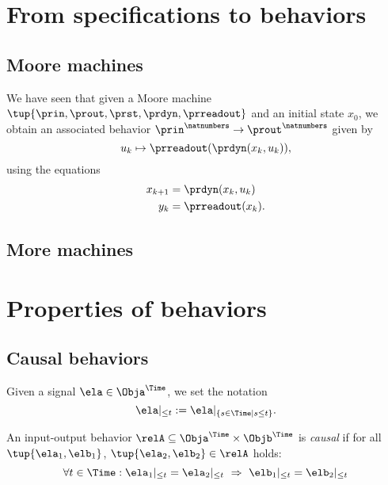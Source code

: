\section{From specifications to behaviors}


\subsection{Moore machines}

We have seen that given a Moore machine $\tup{\prin, \prout, \prst, \prdyn, \prreadout}$ and an initial state $x_0$, we obtain an associated behavior $\prin^\natnumbers \to  \prout^\natnumbers$ given by 
\begin{equation}
u_k \mapsto \prreadout(\prdyn(x_k, u_k)), 
\end{equation}
using the equations
\begin{align}
x_{k+1} &= \prdyn(x_k, u_k) \\
y_{k} &= \prreadout(x_{k}).
\end{align}



\subsection{More machines}


\section{Properties of behaviors}

\subsection{Causal behaviors}

Given a signal $\ela \in \Obja^\Time$, we set the notation
\begin{equation}
    \ela \vert_{\leq t} :=  \ela \vert_{\{ s \in \Time \mid s \leq t\}}.
\end{equation}

\begin{definition}
    An input-output behavior $\relA \subseteq \Obja^\Time \times \Objb^\Time$ is \emph{causal} if for all~$\tup{\ela_1, \elb_1}$, $\tup{\ela_2, \elb_2} \in \relA$ holds:
    \begin{equation}
        \forall t \in \Time: \ela_1 \vert_{ \leq t} = \ela_2 \vert_{ \leq t} \  \Rightarrow \ \elb_1 \vert_{ \leq t} = \elb_2 \vert_{ \leq t}
    \end{equation}
\end{definition}

